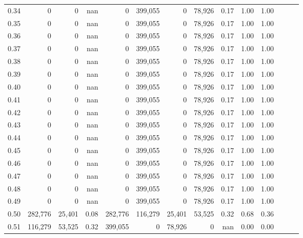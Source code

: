 \begin{tabular}{rrrrrrrrrrrrrr}
0.34 &        0 &       0 &   nan &        0 &  399,055 &       0 &  78,926 &  0.17 &  1.00 &      1.00 \\
0.35 &        0 &       0 &   nan &        0 &  399,055 &       0 &  78,926 &  0.17 &  1.00 &      1.00 \\
0.36 &        0 &       0 &   nan &        0 &  399,055 &       0 &  78,926 &  0.17 &  1.00 &      1.00 \\
0.37 &        0 &       0 &   nan &        0 &  399,055 &       0 &  78,926 &  0.17 &  1.00 &      1.00 \\
0.38 &        0 &       0 &   nan &        0 &  399,055 &       0 &  78,926 &  0.17 &  1.00 &      1.00 \\
0.39 &        0 &       0 &   nan &        0 &  399,055 &       0 &  78,926 &  0.17 &  1.00 &      1.00 \\
0.40 &        0 &       0 &   nan &        0 &  399,055 &       0 &  78,926 &  0.17 &  1.00 &      1.00 \\
0.41 &        0 &       0 &   nan &        0 &  399,055 &       0 &  78,926 &  0.17 &  1.00 &      1.00 \\
0.42 &        0 &       0 &   nan &        0 &  399,055 &       0 &  78,926 &  0.17 &  1.00 &      1.00 \\
0.43 &        0 &       0 &   nan &        0 &  399,055 &       0 &  78,926 &  0.17 &  1.00 &      1.00 \\
0.44 &        0 &       0 &   nan &        0 &  399,055 &       0 &  78,926 &  0.17 &  1.00 &      1.00 \\
0.45 &        0 &       0 &   nan &        0 &  399,055 &       0 &  78,926 &  0.17 &  1.00 &      1.00 \\
0.46 &        0 &       0 &   nan &        0 &  399,055 &       0 &  78,926 &  0.17 &  1.00 &      1.00 \\
0.47 &        0 &       0 &   nan &        0 &  399,055 &       0 &  78,926 &  0.17 &  1.00 &      1.00 \\
0.48 &        0 &       0 &   nan &        0 &  399,055 &       0 &  78,926 &  0.17 &  1.00 &      1.00 \\
0.49 &        0 &       0 &   nan &        0 &  399,055 &       0 &  78,926 &  0.17 &  1.00 &      1.00 \\
0.50 &  282,776 &  25,401 &  0.08 &  282,776 &  116,279 &  25,401 &  53,525 &  0.32 &  0.68 &      0.36 \\
0.51 &  116,279 &  53,525 &  0.32 &  399,055 &        0 &  78,926 &       0 &   nan &  0.00 &      0.00 \\

\end{tabular}
